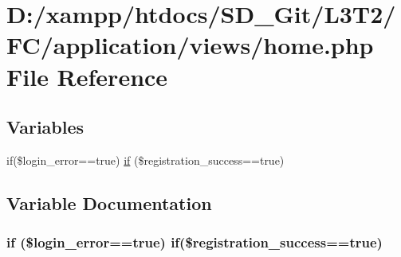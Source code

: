 \hypertarget{application_2views_2_home_8php}{}\section{D\+:/xampp/htdocs/\+S\+D\+\_\+\+Git/\+L3\+T2/\+F\+C/application/views/home.php File Reference}
\label{application_2views_2_home_8php}
\subsection*{Variables}
\begin{DoxyCompactItemize}
\item 
if(\$login\+\_\+error==true) \hyperlink{application_2views_2_home_8php_a1a1fc1726253ea4522f69aed645d8d2e}{if} (\$registration\+\_\+success==true)
\end{DoxyCompactItemize}


\subsection{Variable Documentation}
\hypertarget{application_2views_2_home_8php_a1a1fc1726253ea4522f69aed645d8d2e}{}
\subsubsection[{if}]{\setlength{\rightskip}{0pt plus 5cm}if (\$login\+\_\+error==true) if(\$registration\+\_\+success==true)}\label{application_2views_2_home_8php_a1a1fc1726253ea4522f69aed645d8d2e}
